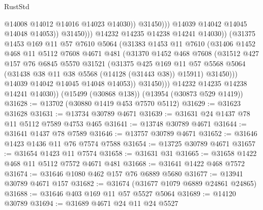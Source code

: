 \begin{lexlean}{RustStd}
\begin{coremodule}
                                    @14008
                                    @14012
                                    @14016
                                    @14023
                                    @14030))
                                @31450)))
                          @14039
                          @14042
                          @14045
                          @14048
                          @14053))
                      @31450)))
                @14232
                @14235
                @14238
                @14241
                @14030))
            (@31375
              @1453
              @169
              @11
              @57
              @7610
              @5064
              (@31383
                @1453
                @11
                @7610
                (@31406
                  @1452
                  @468
                  @11
                  @5112
                  @7608
                  @4671
                  @481
                  (@31370
                    @1452
                    @468
                    @7608
                    (@31512
                      @427
                      @157
                      @76
                      @6845
                      @5570
                      @31521
                      (@31375
                        @425
                        @169
                        @11
                        @57
                        @5568
                        @5064
                        (@31438 @38 @11 @38 @5568 (@14128 (@31443 @38)) @15911)
                        @31450)))
                  @14039
                  @14042
                  @14045
                  @14048
                  @14053))
              @31450)))
        @14232
        @14235
        @14238
        @14241
        @14030))
    (@15499 (@30868 @138))
    (@13954 (@30873 @529 @1419))
@31628 := @13702 (@30880 @1419 @453 @7570 @5112)
@31629 := @31623 @31628
@31631 := @13734 @30789 @4671
@31639 := @31631 @24 @1437 @78 @11 @5112 @7589 @4753 @465
@31641 := @13748 @30789 @4671
@31644 := @31641 @1437 @78 @7589
@31646 := @13757 @30789 @4671
@31652 := @31646 @1423 @1436 @11 @76 @7574 @7588
@31654 := @13725 @30789 @4671
@31657 := @31654 @1423 @11 @7574
@31658 := @31631 @31
@31665 := @31658 @1422 @468 @11 @5112 @7572 @4671 @481
@31668 := @31641 @1422 @468 @7572
@31674 := @31646 @1080 @462 @157 @76 @6889 @5680
@31677 := @13941 @30789 @4671 @157
@31682 := @31674 (@31677 @1079 @6889 @24861 @24865)
@31688 := @31646 @403 @169 @11 @57 @5527 @5064
@31689 := @14120 @30789
@31694 := @31689 @4671 @24 @11 @24 @5527

\end{coremodule}
\end{lexlean}
